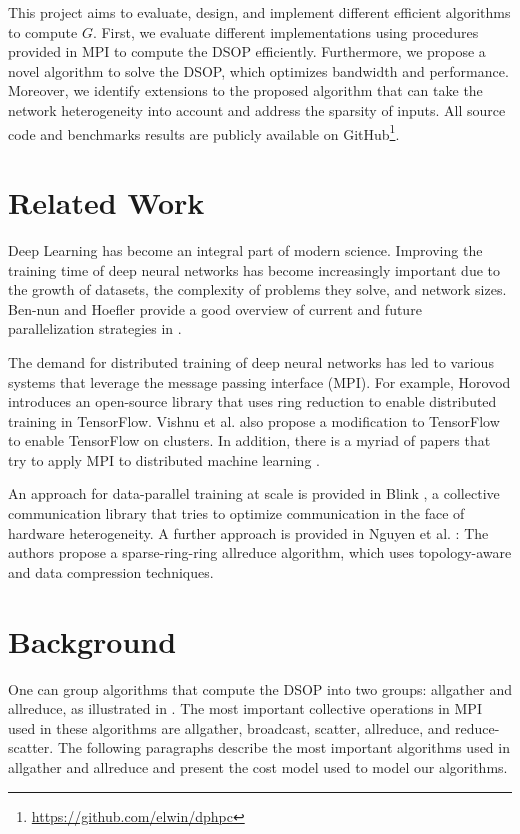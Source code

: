 \documentclass[letterpaper]{article}
\begin{document}
This project aims to evaluate, design, and implement different efficient algorithms to compute $G$. First, we evaluate different implementations using procedures provided in MPI to compute the DSOP efficiently. Furthermore, we propose a novel algorithm to solve the DSOP, which optimizes bandwidth and performance. Moreover, we identify extensions to the proposed algorithm that can take the network heterogeneity into account and address the sparsity of inputs.
All source code and benchmarks results are publicly available on GitHub\footnote{\url{https://github.com/elwin/dphpc}}.

\section{Related Work}

Deep Learning has become an integral part of modern science. Improving the training time of deep neural networks has become increasingly important due to the growth of datasets, the complexity of problems they solve, and network sizes. Ben-nun and Hoefler provide a good overview of current and future parallelization strategies in \cite{demystifying_hoefler}.

The demand for distributed training of deep neural networks has led to various systems that leverage the message passing interface (MPI). For example, Horovod \cite{horovod} introduces an open-source library that uses ring reduction to enable distributed training in TensorFlow. Vishnu et al. \cite{distributed_TF_with_MPI} also propose a modification to TensorFlow to enable TensorFlow on clusters. In addition, there is a myriad of papers that try to apply MPI to distributed machine learning \cite{distributed_TF_with_MPI, ma2016theano_MPI, distributed_ML_for_computational_engineering_using_MPI}.

An approach for data-parallel training at scale is provided in Blink \cite{blink}, a collective communication library that tries to optimize communication in the face of hardware heterogeneity. A further approach is provided in Nguyen et al. \cite{topology_aware_sparse_allreduce}: The authors propose a sparse-ring-ring allreduce algorithm, which uses topology-aware and data compression techniques.


\section{Background}

One can group algorithms that compute the DSOP into two groups: allgather and allreduce, as illustrated in . The most important collective operations in MPI used in these algorithms are allgather, broadcast, scatter, allreduce, and reduce-scatter. The following paragraphs describe the most important algorithms used in allgather and allreduce and present the cost model used to model our algorithms.
\end{document}
